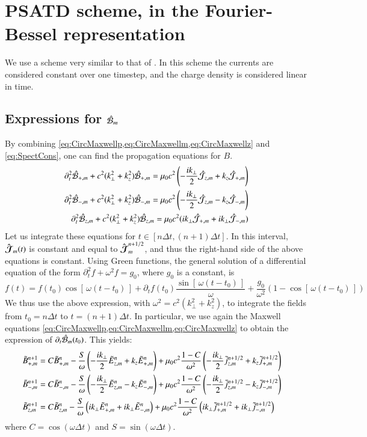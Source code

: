 \section{PSATD scheme, in the Fourier-Bessel
  representation}
\label{sec:PSTADderiv}

We use a scheme very similar to that of \cite{Haber}. In this scheme the currents are considered constant over one timestep, and the charge density is considered linear in time.

\subsection{Expressions for $\hat{\mathcal{B}}_m$}

By combining \cref{eq:CircMaxwellp,eq:CircMaxwellm,eq:CircMaxwellz}
and \cref{eq:SpectCons}, one can find the propagation equations for $B$.
\begin{align*}
\partial_t^2 \hat{\mathcal{B}}_{+,m} + c^2(k_\perp ^2+k_z^2) \hat{\mathcal{B}}_{+,m} = 
\mu_0 c^2 \left( - \frac{ik_\perp }{2} \hat{\mathcal{J}}_{z,m} + k_z \hat{\mathcal{J}}_{+,m}
\right) \\
\partial_t^2 \hat{\mathcal{B}}_{-,m} + c^2(k_\perp ^2+k_z^2) \hat{\mathcal{B}}_{-,m} = 
\mu_0 c^2 \left( - \frac{ik_\perp }{2} \hat{\mathcal{J}}_{z,m} - k_z \hat{\mathcal{J}}_{-,m}
\right) \\
\partial_t^2 \hat{\mathcal{B}}_{z,m} + c^2(k_\perp ^2+k_z^2) \hat{\mathcal{B}}_{z,m} =
\mu_0c^2  (ik_\perp  \hat{\mathcal{J}}_{+,m} + ik_\perp \hat{\mathcal{J}}_{-,m} ) 
\end{align*}
Let us integrate these equations for $t\in [n\Delta t, (n+1)\Delta
t]$. In this interval, $\boldsymbol{\hat{\mathcal{J}}}_m(t)$ is constant
and equal to $\boldsymbol{\hat{\mathcal{J}}}_m^{n+1/2}$, and thus the right-hand side of the above
equations is constant. Using Green functions, the
general solution of a differential equation of the form 
$\partial_t^2 f + \omega^2 f = g_0$, where $g_0$ is a constant, is 
\[ f(t) = f(t_0) \cos[\,\omega (t-t_0)\,] + \partial_t f (t_0) \frac{
  \sin[\,\omega (t-t_0)\,]  }{\omega} + \frac{g_0}{\omega^2} (1-
\cos[\,\omega (t-t_0)\,] ) \]  
We thus use the above expression, with $\omega^2 =c^2(k_\perp^2 +
k_z^2)$, to integrate the fields from $t_0 = n\Delta t$ to $t=(n+1)\Delta t$. In
particular, we use again the Maxwell equations
\cref{eq:CircMaxwellp,eq:CircMaxwellm,eq:CircMaxwellz} to obtain the
expression of $\partial_t \hat{\mathcal{B}}_{m} (t_0)$. This yields:
\begin{align*}
\tilde{B}_{+,m}^{n+1} = \; & C \tilde{B}_{+,m}^{n} - 
\frac{S}{\omega}\left(-\frac{ik_\perp }{2} \tilde{E}_{z,m}^{n} + k_z\tilde{E}_{+,m}^{n}
\right) + \mu_0 c^2\frac{1-C}{\omega^2} \left( -\frac{ik_\perp }{2}
  \tilde{j}_{z,m}^{n+1/2} + k_z \tilde{j}_{+,m}^{n+1/2} \right)& \\
\tilde{B}_{-,m}^{n+1} =\; & C \tilde{B}_{-,m}^{n} - 
\frac{S}{\omega}\left(- \frac{ik_\perp }{2} \tilde{E}_{z,m}^{n} - k_z\tilde{E}_{-,m}^{n}
\right) + \mu_0 c^2\frac{1-C}{\omega^2} \left( - \frac{ik_\perp }{2}
  \tilde{j}_{z,m}^{n+1/2} - k_z \tilde{j}_{-,m}^{n+1/2} \right) &\\
\tilde{B}_{z,m}^{n+1} =\; & C \tilde{B}_{z,m}^{n} - 
\frac{S}{\omega}\left(ik_\perp \tilde{E}_{+,m}^{n} + ik_\perp \tilde{E}_{-,m}^{n}
\right) + \mu_0 c^2\frac{1-C}{\omega^2} \left( ik_\perp
  \tilde{j}_{+,m}^{n+1/2} + ik_\perp \tilde{j}_{-,m}^{n+1/2} \right)&
\end{align*}
where $C = \cos(\omega \Delta t)$ and $S = \sin(\omega \Delta t) $.

